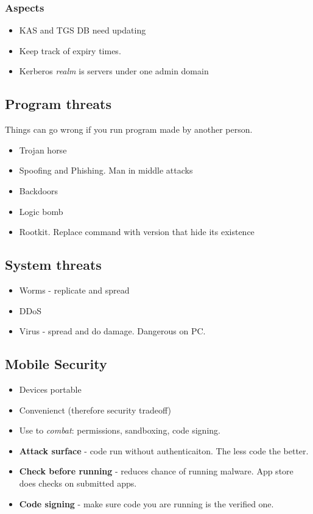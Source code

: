 \documentclass{article}
\begin{document}
		\subsubsection{Aspects}
			\begin{itemize}
				\item KAS and TGS DB need updating
				\item Keep track of expiry times.
				\item Kerberos \textit{realm} is servers under one admin domain
			\end{itemize}
			
	\subsection{Program threats}
		Things can go wrong if you run program made by another person.
		\begin{itemize}
			\item Trojan horse
			\item Spoofing and Phishing. Man in middle attacks
			\item Backdoors
			\item Logic bomb
			\item Rootkit. Replace command with version that hide its existence
		\end{itemize}
		
	\subsection{System threats}
		\begin{itemize}
			\item Worms - replicate and spread
			\item DDoS
			\item Virus - spread and do damage. Dangerous on PC.
		\end{itemize}
		
	\subsection{Mobile Security}
		\begin{itemize}
			\item Devices portable
			\item Convenienct (therefore security tradeoff)
			\item Use to \textit{combat}: permissions, sandboxing, code signing.
		\end{itemize}
		
		\begin{itemize}
			\item \textbf{Attack surface} - code run without authenticaiton. The less code the better.
			\item \textbf{Check before running} - reduces chance of running malware. App store does checks on submitted apps.
			\item \textbf{Code signing} - make sure code you are running is the verified one.
		\end{itemize}
		
\end{document}
